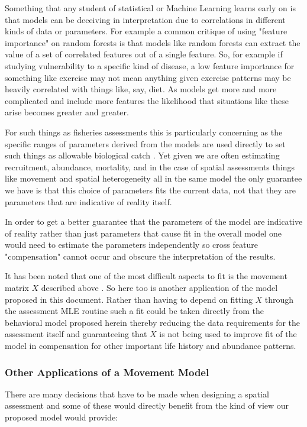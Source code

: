\documentclass[11pt]{article}
\begin{document}
Something that any student of statistical or Machine Learning learns early on is that models can be deceiving in interpretation due to correlations in different kinds of data or parameters. For example a common critique of using "feature importance" on random forests is that models like random forests can extract the value of a set of correlated features out of a single feature. So, for example if studying vulnerability to a specific kind of disease, a low feature importance for something like exercise may not mean anything given exercise patterns may be heavily correlated with things like, say, diet. As models get more and more complicated and include more features the likelihood that situations like these arise becomes greater and greater. 

For such things as fisheries assessments this is particularly concerning as the specific ranges of parameters derived from the models are used directly to set such things as allowable biological catch \cite{king}. Yet given we are often estimating recruitment, abundance, mortality, and in the case of spatial assessments things like movement and spatial heterogeneity all in the same model the only guarantee we have is that this choice of parameters fits the current data, not that they are parameters that are indicative of reality itself. 

In order to get a better guarantee that the parameters of the model are indicative of reality rather than just parameters that cause fit in the overall model one would need to estimate the parameters independently so cross feature "compensation" cannot occur and obscure the interpretation of the results. 

It has been noted that one of the most difficult aspects to fit is the movement matrix $X$ described above \cite{punt2019}. So here too is another application of the model proposed in this document. Rather than having to depend on fitting $X$ through the assessment MLE routine such a fit could be taken directly from the behavioral model proposed herein thereby reducing the data requirements for the assessment itself and guaranteeing that $X$ is not being used to improve fit of the model in compensation for other important life history and abundance patterns. 

\subsubsection{Other Applications of a Movement Model}

There are many decisions that have to be made when designing a spatial assessment \cite{cadrin2020} \cite{goethel2023} and some of these would directly benefit from the kind of view our proposed model would provide:
\end{document}
